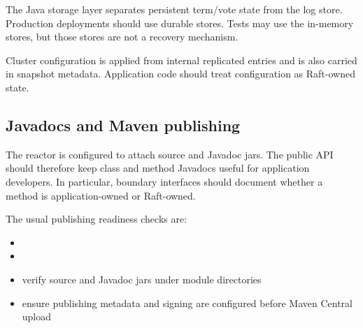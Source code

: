 The Java storage layer separates persistent term/vote state from the log store.
Production deployments should use durable stores. Tests may use the in-memory
stores, but those stores are not a recovery mechanism.

Cluster configuration is applied from internal replicated entries and is also
carried in snapshot metadata. Application code should treat configuration as
Raft-owned state.

\subsection{Javadocs and Maven publishing}

The reactor is configured to attach source and Javadoc jars. The public API
should therefore keep class and method Javadocs useful for application
developers. In particular, boundary interfaces should document whether a method
is application-owned or Raft-owned.

The usual publishing readiness checks are:

\begin{itemize}
\item {}
\item {}
\item verify source and Javadoc jars under module  directories
\item ensure publishing metadata and signing are configured before Maven Central upload
\end{itemize}
